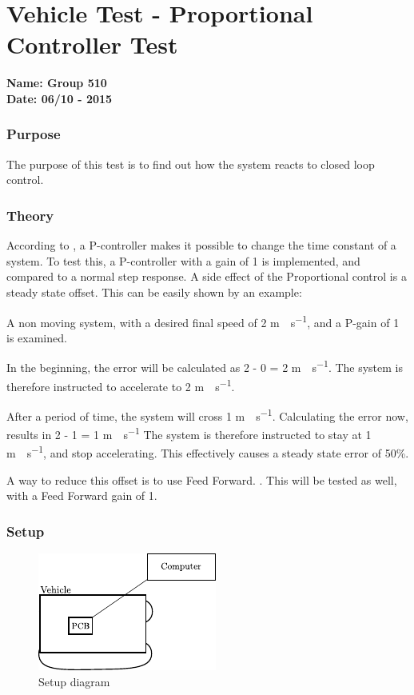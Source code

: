 \pagebreak
\section{Vehicle Test - Proportional Controller Test} \label{app:proportionalControllerTest}
\textbf{Name: Group 510}\\
\textbf{Date: 06/10 - 2015}

\subsubsection{Purpose}
The purpose of this test is to find out how the system reacts to closed loop control.

\subsubsection{Theory}
According to , a P-controller makes it possible to change the time constant of a system. To test this, a P-controller with a gain of 1 is implemented, and compared to a normal step response.
A side effect of the Proportional control is a steady state offset. This can be easily shown by an example:

A non moving system, with a desired final speed of 2 \si{m \cdot s^{-1}}, and a P-gain of 1 is examined.

In the beginning, the error will be calculated as 2 - 0 = 2 \si{m \cdot s^{-1}}. The system is therefore instructed to accelerate to 2 \si{m \cdot s^{-1}}.

After a period of time, the system will cross 1 \si{m \cdot s^{-1}}. Calculating the error now, results in 2 - 1 = 1 \si{m \cdot s^{-1}}
The system is therefore instructed to stay at 1 \si{m \cdot s^{-1}}, and stop accelerating. This effectively causes a steady state error of 50\%.

A way to reduce this offset is to use Feed Forward. . This will be tested as well, with a Feed Forward gain of 1.

\subsubsection{Setup}

\begin{figure}[H]
	\centering
	\includegraphics[scale=1.6]{figures/inertiaTestSetupDiagram2.pdf}
	\caption{Setup diagram}
	\label{GainAndTimeTestSetupDiagram}
\end{figure}

